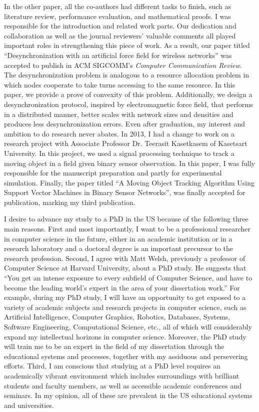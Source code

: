 \documentclass[a4paper,10pt]{report}
\begin{document}
\vspace{0.2cm}
In the other paper, all the co-authors had different tasks to finish, such as literature review, performance evaluation, and mathematical proofs. I was responsible for the introduction and related work parts. Our dedication and collaboration as well as the journal reviewers' valuable comments all played important roles in strengthening this piece of work. As a result, our paper titled ``Desynchronization with an artificial force field for wireless networks'' was accepted to publish in ACM SIGCOMM's \textit{Computer Communication Review}. The desynchronization problem is analogous to a resource allocation problem in which nodes cooperate to take turns accessing to the same resource. In this paper, we provide a prove of convexity of this problem. Additionally, we design a desynchronization protocol, inspired by electromagnetic force field, that performs in a distributed manner, better scales with network sizes and densities and produces less desynchronization errors. Even after graduation, my interest and ambition to do research never abates. In 2013, I had a change to work on a research project with Associate Professor Dr. Teerasit Kasetkasem of Kasetsart University. In this project, we used a signal processing technique to track a moving object in a field given binary sensor observation. In this paper, I was fully responsible for the manuscript preparation and partly for experimental simulation. Finally, the paper titled ``A Moving Object Tracking Algorithm Using Support Vector Machines in Binary Sensor Networks'', was finally accepted for publication, marking my third publication. 

\vspace{0.2cm}
I desire to advance my study to a PhD in the US because of the following three main reasons. First and most importantly, I want to be a professional researcher in computer science in the future, either in an academic institution or in a research laboratory and a doctoral degree is an important precursor to the research profession. Second, I agree with Matt Welsh, previously a professor of Computer Science at Harvard University, about a PhD study. He suggests that ``You get an intense exposure to every subfield of Computer Science, and have to become the leading world's expert in the area of your dissertation work.'' For example, during my PhD study, I will have an opportunity to get exposed to a variety of academic subjects and research projects in computer science, such as Artificial Intelligence, Computer Graphics, Robotics, Databases, Systems, Software Engineering, Computational Science, etc., all of which will considerably expand my intellectual horizons in computer science. Moreover, the PhD study will train me to be an expert in the field of my dissertation through the educational systems and processes, together with my assiduous and persevering efforts. Third, I am conscious that studying at a PhD level requires an academically vibrant environment which includes surroundings with brilliant students and faculty members, as well as accessible academic conferences and seminars. In my opinion, all of these are prevalent in the US educational systems and universities.
\end{document}
